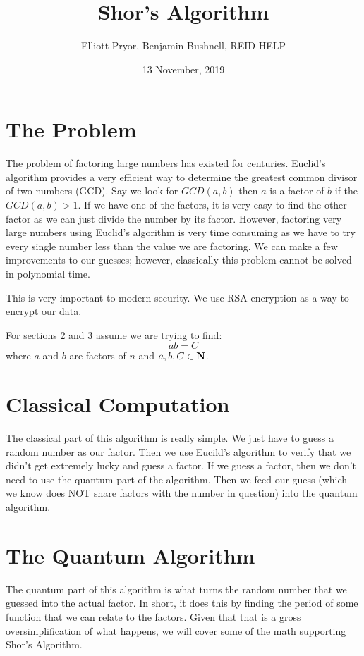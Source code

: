 \documentclass[a4paper]{article}
\title{Shor's Algorithm}
\author{Elliott Pryor, Benjamin Bushnell, REID HELP}
\date{13 November, 2019}
\begin{document}
\maketitle %
\section{The Problem}
The problem of factoring large numbers has existed for centuries. Euclid's algorithm provides a very efficient way to determine the greatest common divisor of two numbers (GCD). Say we look for $GCD(a,b)$ then $a$ is a factor of $b$ if the $GCD(a, b) > 1$. If we have one of the factors, it is very easy to find the other factor as we can just divide the number by its factor. However, factoring very large numbers using Euclid's algorithm is very time consuming as we have to try every single number less than the value we are factoring. We can make a few improvements to our guesses; however, classically this problem cannot be solved in polynomial time.

This is very important to modern security. We use RSA encryption as a way to encrypt our data. 

For sections \ref{classicalSec} and \ref{quantumSec} assume we are trying to find: 
$$ab = C$$
where $a$ and $b$ are factors of $n$ and $a,b,C \in \mathbf{N}$.

\section{Classical Computation}
\label{classicalSec}
The classical part of this algorithm is really simple. We just have to guess a random number as our factor. Then we use Eucild's algorithm to verify that we didn't get extremely lucky and guess a factor. If we guess a factor, then we don't need to use the quantum part of the algorithm. Then we feed our guess (which we know does NOT share factors with the number in question) into the quantum algorithm. 


\section{The Quantum Algorithm}
\label{quantumSec}

The quantum part of this algorithm is what turns the random number that we guessed into the actual factor. In short, it does this by finding the period of some function that we can relate to the factors. Given that that is a gross oversimplification of what happens, we will cover some of the math supporting Shor's Algorithm. 
\end{document}

